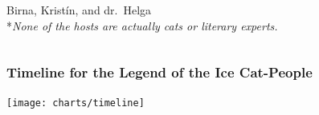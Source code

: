 \begin{frame}
\begin{columns}[T]
\begin{column}{0.45\textwidth}
            \vfill
            Birna, Krist\'{i}n, and dr.~Helga\\
            \vspace{12pt}
            \footnotesize{*\emph{None of the hosts are actually cats or literary experts.}}
        \end{column}
    \end{columns}
\end{frame}

\begin{frame}
    \frametitle{Timeline for the Legend of the Ice Cat-People}
    \texttt{[image: charts/timeline]}
\end{frame}

